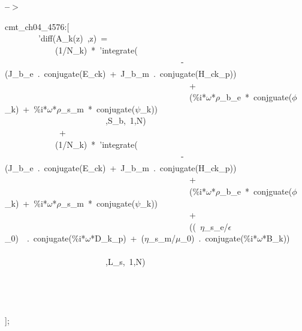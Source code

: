 \documentclass[fleqn]{article}
\begin{document}
\noindent
\begin{minipage}[t]{4.000000em}\color{red}\bfseries
 --\ensuremath{\ensuremath{>}}	
\end{minipage}
\begin{minipage}[t]{\textwidth}\color{blue}
cmt\_ch04\_4576:[\\
\ \ \ \ \ \ \ \ 'diff(A\_k(z)\ ,z)\ =\ \\
\ \ \ \ \ \ \ \ \ \ \ \ (1/N\_k)\ *\ 'integrate(\ \\
\ \ \ \ \ \ \ \ \ \ \ \ \ \ \ \ \ \ \ \ \ \ \ \ \ \ \ \ \ \ \ \ \ \ \ \ \ \ \ \ \ \ -(J\_b\_e\ .\ conjugate(E\_ck)\ +\ J\_b\_m\ .\ conjugate(H\_ck\_p))\ \\
\ \ \ \ \ \ \ \ \ \ \ \ \ \ \ \ \ \ \ \ \ \ \ \ \ \ \ \ \ \ \ \ \ \ \ \ \ \ \ \ \ \ \ \ +\\
\ \ \ \ \ \ \ \ \ \ \ \ \ \ \ \ \ \ \ \ \ \ \ \ \ \ \ \ \ \ \ \ \ \ \ \ \ \ \ \ \ \ \ \ (\%i*\ensuremath{\omega}*\ensuremath{\rho}\_b\_e\ *\ conjguate(\ensuremath{\phi}\_k)\ +\ \%i*\ensuremath{\omega}*\ensuremath{\rho}\_s\_m\ *\ conjugate(\ensuremath{\psi}\_k))\ \\
\ \ \ \ \ \ \ \ \ \ \ \ \ \ \ \ \ \ \ \ \ \ \ \ ,S\_b,\ 1,N)\\
\ \ \ \ \ \ \ \ \ \ \ \ \ +\\
\ \ \ \ \ \ \ \ \ \ \ \ (1/N\_k)\ *\ 'integrate(\ \\
\ \ \ \ \ \ \ \ \ \ \ \ \ \ \ \ \ \ \ \ \ \ \ \ \ \ \ \ \ \ \ \ \ \ \ \ \ \ \ \ \ \ -(J\_b\_e\ .\ conjugate(E\_ck)\ +\ J\_b\_m\ .\ conjugate(H\_ck\_p))\ \\
\ \ \ \ \ \ \ \ \ \ \ \ \ \ \ \ \ \ \ \ \ \ \ \ \ \ \ \ \ \ \ \ \ \ \ \ \ \ \ \ \ \ \ \ +\\
\ \ \ \ \ \ \ \ \ \ \ \ \ \ \ \ \ \ \ \ \ \ \ \ \ \ \ \ \ \ \ \ \ \ \ \ \ \ \ \ \ \ \ \ (\%i*\ensuremath{\omega}*\ensuremath{\rho}\_b\_e\ *\ conjguate(\ensuremath{\phi}\_k)\ +\ \%i*\ensuremath{\omega}*\ensuremath{\rho}\_s\_m\ *\ conjugate(\ensuremath{\psi}\_k))\\
\ \ \ \ \ \ \ \ \ \ \ \ \ \ \ \ \ \ \ \ \ \ \ \ \ \ \ \ \ \ \ \ \ \ \ \ \ \ \ \ \ \ \ \ +\\
\ \ \ \ \ \ \ \ \ \ \ \ \ \ \ \ \ \ \ \ \ \ \ \ \ \ \ \ \ \ \ \ \ \ \ \ \ \ \ \ \ \ \ \ ((\ \ensuremath{\eta}\_s\_e/\ensuremath{\epsilon}\_0)\ \ .\ conjugate(\%i*\ensuremath{\omega}*D\_k\_p)\ +\ (\ensuremath{\eta}\_s\_m/\ensuremath{\mu}\_0)\ .\ conjugate(\%i*\ensuremath{\omega}*B\_k))\\
\\
\ \ \ \ \ \ \ \ \ \ \ \ \ \ \ \ \ \ \ \ \ \ \ \ ,L\_s,\ 1,N)\\
\ \ \ \ \ \ \ \ \\
\\
\ \ \ \ \\
\\
];
\end{minipage}
\end{document}
